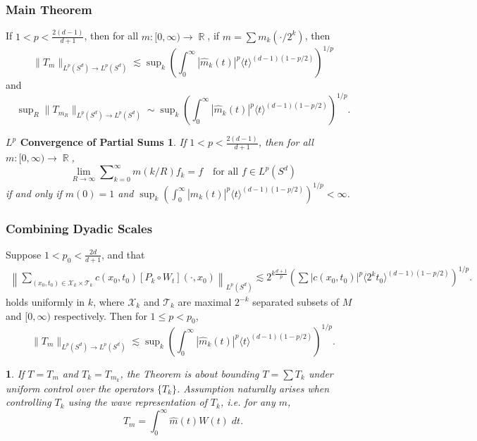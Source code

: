 \documentclass[usenames,dvipsnames,10pt]{beamer}
\DeclareMathOperator{\RR}{\mathbb{R}}
\newtheorem*{nothing}{}
\newtheorem*{partialsums}{$L^p$ Convergence of Partial Sums}
\begin{document}
\begin{frame}
    \frametitle{Main Theorem}

    \small
    \begin{theorem}
        If $1 < p < \frac{2(d-1)}{d+1}$, then for all $m: [0,\infty) \to \RR$, if $m = \sum m_k(\cdot/2^k)$, then
        \[ \| T_m \|_{L^p(S^d) \to L^p(S^d)} \lesssim \sup\nolimits_k \left( \int_0^\infty |\widehat{m}_k(t)|^p \langle t \rangle^{(d-1)(1 - p/2)} \right)^{1/p} \]
        and
        \[ \sup\nolimits_R \| T_{m_R} \|_{L^p(S^d) \to L^p(S^d)} \sim \sup\nolimits_k \left( \int_0^\infty |\widehat{m}_k(t)|^p \langle t \rangle^{(d-1)(1 - p/2)} \right)^{1/p}. \]
    \end{theorem}

    \pause

    \begin{partialsums}
        If $1 < p < \frac{2(d-1)}{d+1}$, then for all $m: [0,\infty) \to \RR$,
        \[ \lim_{R \to \infty} \sum\nolimits_{k = 0}^\infty m(k/R) f_k = f \quad\text{for all $f \in L^p(S^d)$} \]
        if and only if $m(0) = 1$ and $\sup\nolimits_k \left( \int_0^\infty |\widehat{m}_k(t)|^p \langle t \rangle^{(d-1)(1 - p/2)} \right)^{1/p} < \infty$.
    \end{partialsums}
    \normalsize
\end{frame}

\begin{frame}
    \frametitle{Combining Dyadic Scales}

    \small
    \begin{theorem}
        Suppose $1 < p_0 < \frac{2d}{d+1}$, and that
        \scriptsize
        \begin{align*}
            \left\| \sum\nolimits_{(x_0,t_0) \in \mathcal{X}_k \times \mathcal{T}_k} c(x_0,t_0) [P_k \circ W_t](\cdot,x_0) \right\|_{L^p(S^d)} \lesssim 2^{k \frac{d+1}{p}} \left( \sum |c(x_0,t_0)|^p \langle 2^k t_0 \rangle^{(d-1)(1 - p/2)} \right)^{1/p}.
        \end{align*}
        \normalsize
        holds uniformly in $k$, where $\mathcal{X}_k$ and $\mathcal{T}_k$ are maximal $2^{-k}$ separated subsets of $M$ and $[0,\infty)$ respectively. Then for $1 \leq p < p_0$,
        \[ \| T_m \|_{L^p(S^d) \to L^p(S^d)} \lesssim \sup\nolimits_k \left( \int_0^\infty |\widehat{m}_k(t)|^p \langle t \rangle^{(d-1)(1 - p/2)} \right)^{1/p}. \]
    \end{theorem}

    \pause
    \begin{nothing}
        If $T = T_m$ and $T_k = T_{m_k}$, the Theorem is about bounding $T = \sum T_k$ under uniform control over the operators $\{ T_k \}$. Assumption naturally arises when controlling $T_k$ using the wave representation of $T_k$, i.e. for any $m$,
        \[ T_{m} = \int_0^\infty \widehat{m}(t) W(t)\; dt. \]
    \end{nothing}
    \normalsize
\end{frame}
\end{document}
